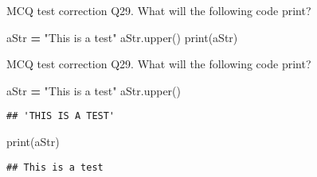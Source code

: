 \documentclass[
  8pt,
  ignorenonframetext,
]{beamer}
\newenvironment{Shaded}{\begin{snugshade}}{\end{snugshade}}
\newcommand{\BuiltInTok}[1]{#1}
\newcommand{\NormalTok}[1]{#1}
\newcommand{\OperatorTok}[1]{\textcolor[rgb]{0.81,0.36,0.00}{\textbf{#1}}}
\newcommand{\StringTok}[1]{\textcolor[rgb]{0.31,0.60,0.02}{#1}}
\begin{document}
\begin{frame}[fragile]{MCQ test correction}
\protect\hypertarget{mcq-test-correction-56}{}
Q29. What will the following code print?

\begin{Shaded}
\begin{Highlighting}[]
\NormalTok{aStr }\OperatorTok{=} \StringTok{"This is a test"}
\NormalTok{aStr.upper()}
\BuiltInTok{print}\NormalTok{(aStr)}
\end{Highlighting}
\end{Shaded}
\end{frame}

\begin{frame}[fragile]{MCQ test correction}
\protect\hypertarget{mcq-test-correction-57}{}
Q29. What will the following code print?

\begin{Shaded}
\begin{Highlighting}[]
\NormalTok{aStr }\OperatorTok{=} \StringTok{"This is a test"}
\NormalTok{aStr.upper()}
\end{Highlighting}
\end{Shaded}

\begin{verbatim}
## 'THIS IS A TEST'
\end{verbatim}

\begin{Shaded}
\begin{Highlighting}[]
\BuiltInTok{print}\NormalTok{(aStr)}
\end{Highlighting}
\end{Shaded}

\begin{verbatim}
## This is a test
\end{verbatim}
\end{frame}
\end{document}
